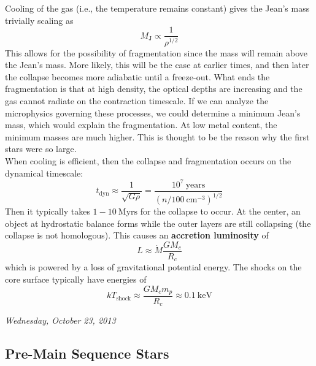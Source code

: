 \documentclass[10pt]{article}
\numberwithin{equation}{section}
\newcommand{\n}{\noindent}
\begin{document}
  \n Cooling of the gas (i.e., the temperature remains constant) gives
  the Jean's mass trivially scaling as
  \begin{equation}
    \label{eq:65}
    M_{\mathrm{J}}\propto \frac{1}{\rho^{1/2}}
  \end{equation}
  This allows for the possibility of fragmentation since the mass will
  remain above the Jean's mass. More likely, this will be the case at
  earlier times, and then later the collapse becomes more adiabatic
  until a freeze-out. What ends the fragmentation is that at high
  density, the optical depths are increasing and the gas cannot
  radiate on the contraction timescale. If we can analyze the
  microphysics governing these processes, we could determine a minimum
  Jean's mass, which would explain the fragmentation. At low metal
  content, the minimum masses are much higher. This is thought to be
  the reason why the first stars were so large.\\

  \n When cooling is efficient, then the collapse and fragmentation
  occurs on the dynamical timescale:
  \begin{equation}
    \label{eq:66}
    t_{\mathrm{dyn}}\approx \frac{1}{\sqrt{G\rho}}=\frac{10^7\
      \mathrm{years}}{(n/100\ \mathrm{cm^{-3}})^{1/2}}
  \end{equation}
  Then it typically takes $1-10\ \mathrm{Myrs}$ for the collapse to
  occur. At the center, an object at hydrostatic balance forms while
  the outer layers are still collapsing (the collapse is not
  homologous). This causes an \textbf{accretion luminosity} of
  \begin{equation}
    \label{eq:67}
    L\approx \dot{M}\frac{G M_c}{R_c}
  \end{equation}
  which is powered by a loss of gravitational potential energy. The
  shocks on the core surface typically have energies of
  \begin{equation}
    \label{eq:68}
    kT_{\mathrm{shock}}\approx \frac{GM_c m_p}{R_c}\approx 0.1\ \mathrm
{keV}
  \end{equation}


	\n \textit{Wednesday, October 23, 2013}

  \subsection{Pre-Main Sequence Stars}
  \label{sec:pre-main-sequence}
\end{document}
